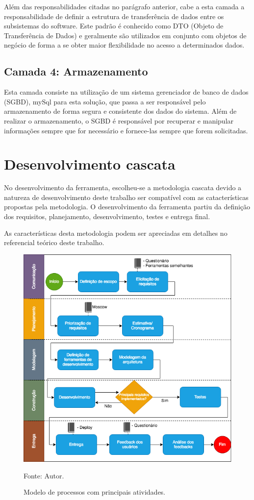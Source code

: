 Além das responsabilidades citadas no parágrafo anterior, cabe a esta camada a responsabilidade de definir a estrutura de transferência de dados entre os subsistemas
do software. Este padrão é conhecido como DTO (Objeto de Transferência de Dados) e geralmente são utilizados em conjunto com objetos de negócio de forma a se obter maior
flexibilidade no acesso a determinados dados.

\subsection{Camada 4: Armazenamento}
Esta camada consiste na utilização de um sistema gerenciador de banco de dados (SGBD), mySql para esta solução, que passa a ser responsável pelo armazenamento de forma segura e consistente
dos dados do sistema. Além de realizar o armazenamento, o SGBD é responsável por recuperar e manipular informações sempre que for necessário e fornece-las sempre que forem solicitadas.

\section{Desenvolvimento cascata}

No desenvolvimento da ferramenta, escolheu-se a metodologia cascata devido a natureza de desenvolvimento deste trabalho ser compatível com as 
catacterísticas propostas pela metodologia. O desenvolvimento da ferramenta partiu da definição dos requisitos, planejamento, desenvolvimento, testes e entrega final.

As características desta metodologia podem ser apreciadas em detalhes no referencial teórico deste trabalho.

\begin{figure}[h]
	\centering
	\includegraphics[keepaspectratio=true,scale=0.6]{figuras/modeloprocesso.png}
	\caption{Modelo de processos com principais atividades.}
	Fonte: {Autor.}
	\label{modeloprocesso}
\end{figure}	

